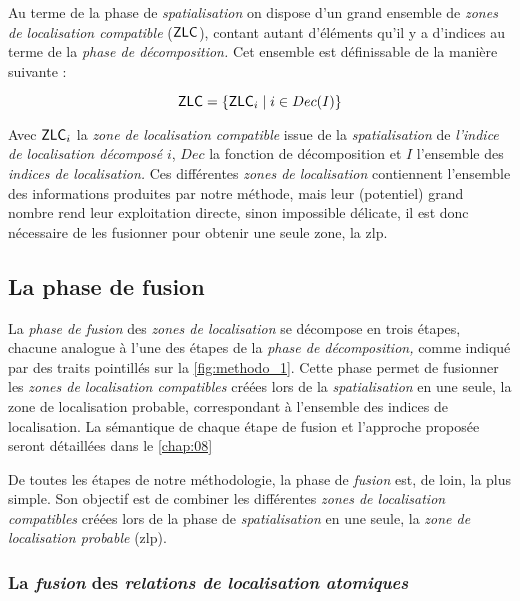 Au terme de la phase de \emph{spatialisation} on dispose d'un grand
ensemble de \emph{zones de localisation compatible}
(\(\text{\textsf{ZLC}}\)), contant autant d'éléments qu'il y a
d'indices au terme de la \emph{phase de décomposition.} Cet ensemble
est définissable de la manière suivante :

\begin{equation}
  \text{\textsf{ZLC}} = \{\text{\textsf{ZLC}}_i \mid i \in Dec(I)\}
\end{equation}

Avec \(\text{\textsf{ZLC}}_i\) la \emph{zone de localisation
  compatible} issue de la \emph{spatialisation} de \emph{l'indice de
  localisation décomposé} \(i\), \(Dec\) la fonction de décomposition
et \(I\) l'ensemble des \emph{indices de localisation.} Ces
différentes \emph{zones de localisation} contiennent l'ensemble des
informations produites par notre méthode, mais leur (potentiel) grand
nombre rend leur exploitation directe, sinon impossible délicate, il
est donc nécessaire de les fusionner pour obtenir une seule zone, la
\ac{zlp}.

\subsection{La phase de fusion}

La \emph{phase de fusion} des \emph{zones de localisation} se
décompose en trois étapes, chacune analogue à l'une des étapes de la
\emph{phase de décomposition,} comme indiqué par des traits pointillés
sur la \autoref{fig:methodo_1}. Cette phase permet de fusionner les
\emph{zones de localisation compatibles} créées lors de la
\emph{spatialisation} en une seule, la zone de localisation probable,
correspondant à l'ensemble des indices de localisation. La sémantique
de chaque étape de fusion et l'approche proposée seront détaillées
dans le \autoref{chap:08}

De toutes les étapes de notre méthodologie, la phase de \emph{fusion}
est, de loin, la plus simple. Son objectif est de combiner les
différentes \emph{zones de localisation compatibles} créées lors de la
phase de \emph{spatialisation} en une seule, la \emph{zone de
  localisation probable} (\ac{zlp}).

\subsubsection{La \emph{fusion} des \emph{relations de localisation
    atomiques}}

